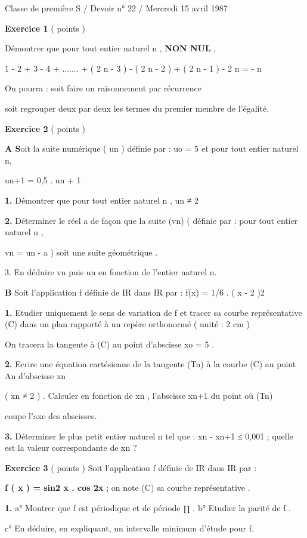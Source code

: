 \documentclass[11pt,a4paper]{article}
\begin{document}
Classe de première S / Devoir n° 22 / Mercredi 15 avril 1987

\textbf{Exercice 1} ( points )

Démontrer que pour tout entier naturel n , \textbf{NON NUL} ,

1 - 2 + 3 - 4 + ....... + ( 2 n - 3 ) - ( 2 n - 2 ) + ( 2 n - 1 ) - 2 n = - n

On pourra : soit faire un raisonnement par récurrence

soit regrouper deux par deux les termes du premier membre de l'égalité.

\textbf{Exercice 2} ( points )

\textbf{A S}oit la suite numérique ( un ) définie par : uo = 5 et pour tout entier naturel n,

un+1 = 0,5 . un + 1

\textbf{1.} Démontrer que pour tout entier naturel n , un ≠ 2

\textbf{2.} Déterminer le réel a de façon que la suite (vn) ( définie par : pour tout entier naturel n ,

vn = un - a ) soit une suite géométrique .

3. En déduire vn puis un en fonction de l'entier naturel n.

\textbf{B} Soit l'application f définie de IR dans IR par : f(x) = 1/6 . ( x - 2 )2

\textbf{1.} Etudier uniquement le sens de variation de f et tracer sa courbe représentative (C) dans un plan rapporté à un repère orthonormé ( unité : 2 cm )

On tracera la tangente à (C) au point d'abscisse xo = 5 .

\textbf{2.} Ecrire une équation cartésienne de la tangente (Tn) à la courbe (C) au point An d'abscisse xn

( xn ≠ 2 ) . Calculer en fonction de xn , l'abscisse xn+1 du point où (Tn)

coupe l'axe des abscisses.

\textbf{3.} Déterminer le plus petit entier naturel n tel que : xn - xn+1 ≤ 0,001 ; quelle est la valeur correspondante de xn ?

\textbf{Exercice 3} ( points ) Soit l'application f définie de IR dans IR par :

\textbf{f ( x ) = sin2 x . cos 2x} ; on note (C) sa courbe représentative .

\textbf{1.} a° Montrer que f est périodique et de période ∏ . b° Etudier la parité de f .

c° En déduire, en expliquant, un intervalle minimum d'étude pour f.
\end{document}
